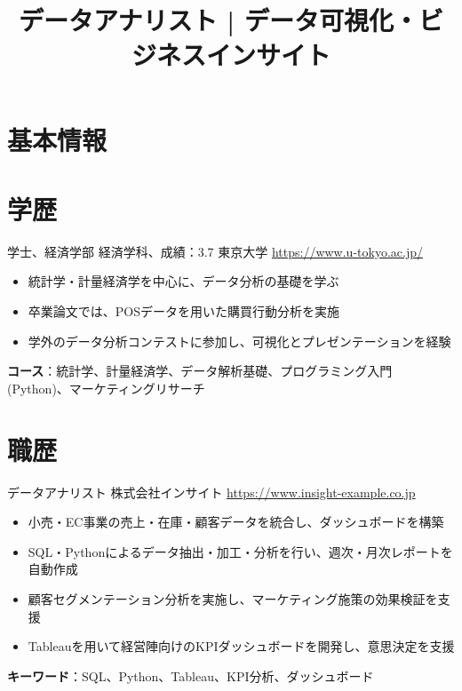 \documentclass[a4paper, serif, 10pt]{moderncv}
\title{データアナリスト | データ可視化・ビジネスインサイト}
\begin{document}
\maketitle

\section{基本情報}

\section{学歴}

        {学士、経済学部 経済学科、成績：3.7}
        {東京大学}
        {\url{https://www.u-tokyo.ac.jp/}}
        {}
        {\begin{itemize}
\item 統計学・計量経済学を中心に、データ分析の基礎を学ぶ
\item 卒業論文では、POSデータを用いた購買行動分析を実施
\item 学外のデータ分析コンテストに参加し、可視化とプレゼンテーションを経験
\end{itemize}
\textbf{コース}：統計学、計量経済学、データ解析基礎、プログラミング入門 (Python)、マーケティングリサーチ}
\section{職歴}

        {データアナリスト}
        {株式会社インサイト}
        {\url{https://www.insight-example.co.jp}}
        {}
        {\begin{itemize}
\item 小売・EC事業の売上・在庫・顧客データを統合し、ダッシュボードを構築
\item SQL・Pythonによるデータ抽出・加工・分析を行い、週次・月次レポートを自動作成
\item 顧客セグメンテーション分析を実施し、マーケティング施策の効果検証を支援
\item Tableauを用いて経営陣向けのKPIダッシュボードを開発し、意思決定を支援
\end{itemize}
\textbf{キーワード}：SQL、Python、Tableau、KPI分析、ダッシュボード}
\end{document}
